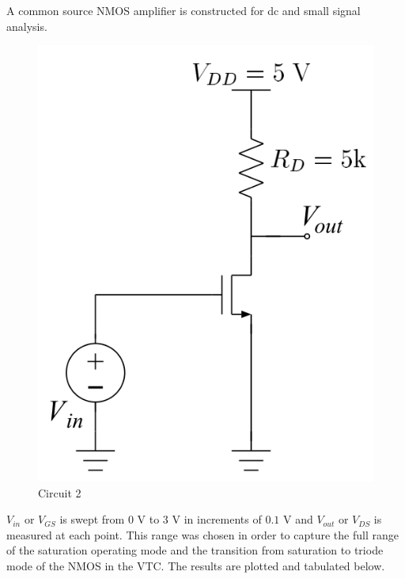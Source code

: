 A common source NMOS amplifier is constructed for dc and small signal analysis.

\FloatBarrier

\begin{figure}[h!]
	\centering
	\includegraphics[scale=0.75]{../images/circuit_2.PNG}
	\caption{Circuit 2}
	\label{fig:circuit_2}
\end{figure}

\FloatBarrier

$V_{in}$ or $V_{GS}$ is swept from $0$ \si{\volt} to $3$ \si{\volt} in increments of $0.1$ \si{\volt} and $V_{out}$ or $V_{DS}$ is measured at each point.
This range was chosen in order to capture the full range of the saturation operating mode and the transition from saturation to triode mode of the NMOS in the VTC.
The results are plotted and tabulated below.

\FloatBarrier

